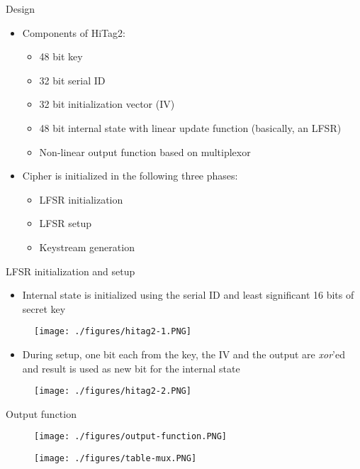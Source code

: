 \documentclass{beamer}
\begin{document}
\begin{frame}{Design}
\begin{itemize}
	\item Components of HiTag2:
	\begin{itemize}
		\item 48 bit key
		\item 32 bit serial ID
		\item 32 bit initialization vector (IV)
		\item 48 bit internal state with linear update function (basically, an LFSR)
		\item Non-linear output function based on multiplexor
	\end{itemize}
	
	\item Cipher is initialized in the following three phases:
	\begin{itemize}
		\item LFSR initialization
		\item LFSR setup
		\item Keystream generation
	\end{itemize}

\end{itemize}
\end{frame}

\begin{frame}{LFSR initialization and setup}
\begin{itemize}
	\item \small{Internal state is initialized using the serial ID and least significant 16 bits of secret key}
\end{itemize}
	\begin{figure}[htp]
	\centering
	\texttt{[image: ./figures/hitag2-1.PNG]}
	\end{figure}
\begin{itemize}
		\item \small{During setup, one bit each from the key, the IV and the output are \textit{xor}'ed and result is used as new bit for the internal state}
\end{itemize}

	\begin{figure}[htp]
	\centering
	\texttt{[image: ./figures/hitag2-2.PNG]}
	\end{figure}
	
\end{frame}

\begin{frame}{Output function}

	\begin{figure}[htp]
	\centering
	\texttt{[image: ./figures/output-function.PNG]}
	\end{figure}
	
	\begin{figure}[htp]
	\centering
	\texttt{[image: ./figures/table-mux.PNG]}
	\end{figure}

\end{frame}
\end{document}
